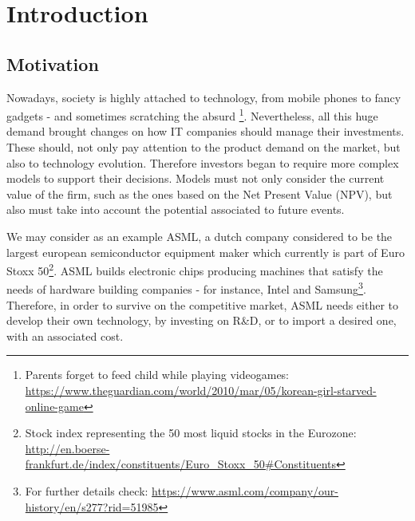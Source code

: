 
\chapter{Introduction}
\label{chapter:introduction}


\section{Motivation}
\label{section:motivation}

Nowadays, society is highly attached to technology, from mobile phones to fancy gadgets - and sometimes scratching the absurd
\footnote{Parents forget to feed child while playing videogames:\\
\url{https://www.theguardian.com/world/2010/mar/05/korean-girl-starved-online-game} }.
 Nevertheless, all this huge demand brought changes on how IT companies should manage their investments. These should, not only pay attention to the product demand on the market, but also to technology evolution. Therefore investors began to require more complex models to support their decisions. Models must not only consider the current value of the firm, such as the ones based on the Net Present Value (NPV), but also must take into account the potential associated to future events.

We may consider as an example ASML, a dutch company considered to be the largest european semiconductor equipment maker which currently is part of Euro Stoxx 50\footnote{Stock index representing the 50 most liquid stocks in the Eurozone:\\  \url{http://en.boerse-frankfurt.de/index/constituents/Euro_Stoxx_50\#Constituents} }.
ASML builds electronic chips producing machines that satisfy the needs of hardware building companies - for instance, Intel and Samsung\footnote{For further details check: \url{https://www.asml.com/company/our-history/en/s277?rid=51985}}.
Therefore, in order to survive on the competitive market, ASML needs either to develop their own technology, by investing on R\&D, or to import a desired one, with an associated cost.

